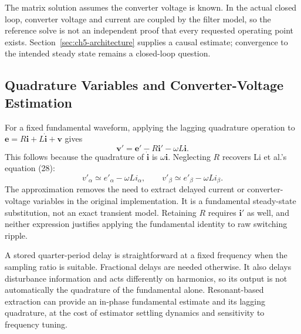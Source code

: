 The matrix solution assumes the converter voltage is known. In the actual closed loop, converter voltage and current are coupled by the filter model, so the reference solve is not an independent proof that every requested operating point exists. Section~\ref{sec:ch5-architecture} supplies a causal estimate; convergence to the intended steady state remains a closed-loop question.

\subsection{Quadrature Variables and Converter-Voltage Estimation}
For a fixed fundamental waveform, applying the lagging quadrature operation to $\mathbf e=R\mathbf i+L\dot{\mathbf i}+\mathbf v$ gives
\begin{equation}
\mathbf v'=\mathbf e'-R\mathbf i'-\omega L\mathbf i.
\label{eq:ch5-resistive-quadrature}
\end{equation}
This follows because the quadrature of $\dot{\mathbf i}$ is $\omega\mathbf i$. Neglecting $R$ recovers Li et al.'s equation (28):
\begin{equation}
v'_\alpha\simeq e'_\alpha-\omega L i_\alpha,\qquad
v'_\beta\simeq e'_\beta-\omega L i_\beta.
\label{eq:ch5-li-substitution}
\end{equation}
The approximation removes the need to extract delayed current or converter-voltage variables in the original implementation. It is a fundamental steady-state substitution, not an exact transient model. Retaining $R$ requires $\mathbf i'$ as well, and neither expression justifies applying the fundamental identity to raw switching ripple.

A stored quarter-period delay is straightforward at a fixed frequency when the sampling ratio is suitable. Fractional delays are needed otherwise. It also delays disturbance information and acts differently on harmonics, so its output is not automatically the quadrature of the fundamental alone. Resonant-based extraction can provide an in-phase fundamental estimate and its lagging quadrature, at the cost of estimator settling dynamics and sensitivity to frequency tuning.

